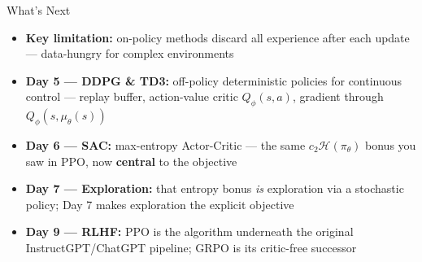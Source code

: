 \begin{frame}{What's Next}
\begin{itemize}
    \item \textbf{Key limitation:} on-policy methods discard all experience after each update --- data-hungry for complex environments
    \pause
    \item \textbf{Day 5 --- DDPG \& TD3:} off-policy deterministic policies for continuous control --- replay buffer, action-value critic $Q_\phi(s,a)$, gradient through $Q_\phi(s,\mu_\theta(s))$
    \item \textbf{Day 6 --- SAC:} max-entropy Actor-Critic --- the same $c_2\mathcal{H}(\pi_\theta)$ bonus you saw in PPO, now \textbf{central} to the objective
    \item \textbf{Day 7 --- Exploration:} that entropy bonus \emph{is} exploration via a stochastic policy; Day 7 makes exploration the explicit objective
    \item \textbf{Day 9 --- RLHF:} PPO is the algorithm underneath the original InstructGPT/ChatGPT pipeline; GRPO is its critic-free successor
\end{itemize}
\end{frame}
